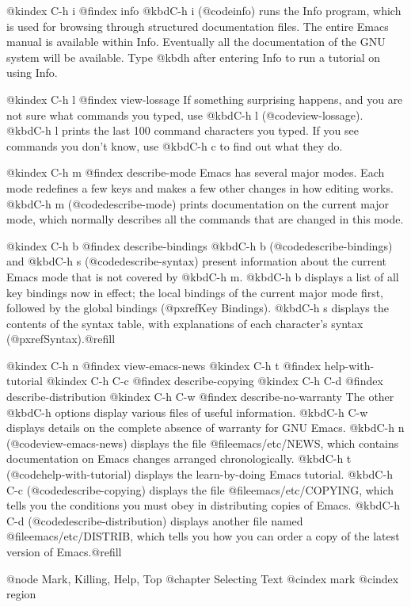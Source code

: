 {{@kindex C-h i
@findex info
  @kbd{C-h i} (@code{info}) runs the Info program, which is used for
browsing through structured documentation files.  The entire Emacs manual
is available within Info.  Eventually all the documentation of the GNU
system will be available.  Type @kbd{h} after entering Info to run
a tutorial on using Info.

@kindex C-h l
@findex view-lossage
  If something surprising happens, and you are not sure what commands you
typed, use @kbd{C-h l} (@code{view-lossage}).  @kbd{C-h l} prints the last
100 command characters you typed.  If you see commands you don't
know, use @kbd{C-h c} to find out what they do.

@kindex C-h m
@findex describe-mode
  Emacs has several major modes. Each mode redefines a few keys and
makes a few other changes in how editing works.  @kbd{C-h m}
(@code{describe-mode}) prints documentation on the current major mode,
which normally describes all the commands that are changed in this mode.

@kindex C-h b
@findex describe-bindings
  @kbd{C-h b} (@code{describe-bindings}) and @kbd{C-h s}
(@code{describe-syntax}) present information about the current Emacs
mode that is not covered by @kbd{C-h m}.  @kbd{C-h b} displays a list of
all key bindings now in effect; the local bindings of the current
major mode first, followed by the global bindings (@pxref{Key
Bindings}).  @kbd{C-h s} displays the contents of the syntax table, with
explanations of each character's syntax (@pxref{Syntax}).@refill

@kindex C-h n
@findex view-emacs-news
@kindex C-h t
@findex help-with-tutorial
@kindex C-h C-c
@findex describe-copying
@kindex C-h C-d
@findex describe-distribution
@kindex C-h C-w
@findex describe-no-warranty
  The other @kbd{C-h} options display various files of useful
information.  @kbd{C-h C-w} displays details on the complete
absence of warranty for GNU Emacs.  @kbd{C-h n} (@code{view-emacs-news})
displays the file @file{emacs/etc/NEWS}, which contains documentation on
Emacs changes arranged chronologically.  @kbd{C-h t}
(@code{help-with-tutorial}) displays the learn-by-doing Emacs tutorial.
@kbd{C-h C-c} (@code{describe-copying}) displays the file
@file{emacs/etc/COPYING}, which tells you the conditions you must obey
in distributing copies of Emacs.  @kbd{C-h C-d}
(@code{describe-distribution}) displays another file named
@file{emacs/etc/DISTRIB}, which tells you how you can order a copy of
the latest version of Emacs.@refill

@node Mark, Killing, Help, Top
@chapter Selecting Text
@cindex mark
@cindex region

}}

